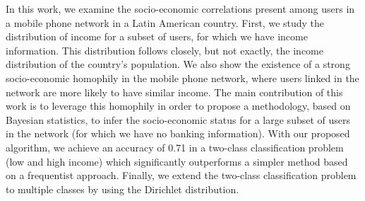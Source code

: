 In this work, we examine the socio-economic correlations present among users in a mobile phone network in a Latin American country. First, we study the distribution of income for a subset of users, for which we have income information. %
This distribution follows closely, but not exactly, the income distribution of the country's population. We also show the existence of a strong socio-economic homophily in the mobile phone network, where users linked in the network are more likely to have similar income. The main contribution of this work is to leverage this homophily in order to propose a methodology, based on Bayesian statistics, to infer the socio-economic status for a large subset of users in the network (for which we have no banking information). With our proposed algorithm, we achieve an accuracy of 0.71 in a two-class classification problem (low and high income) which significantly outperforms a simpler method based on a frequentist approach. Finally, we extend the two-class classification problem to multiple classes by using the Dirichlet distribution.
